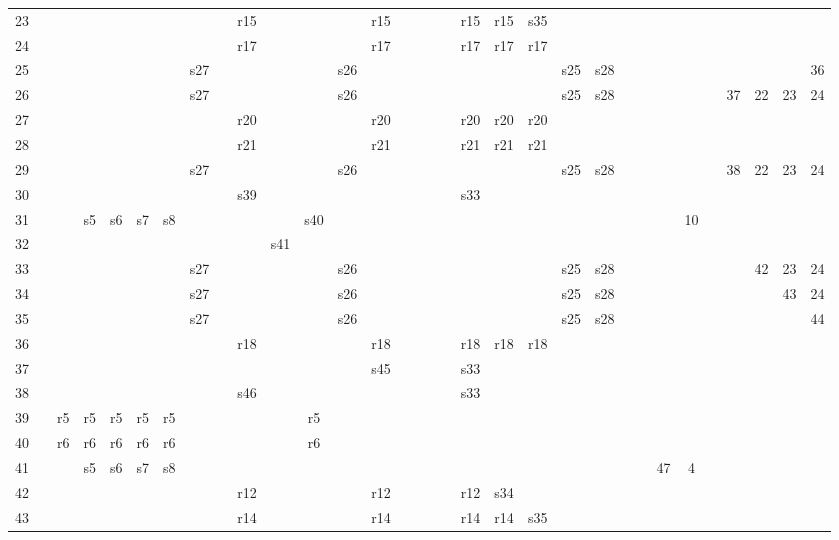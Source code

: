 \documentclass[12pt, letterpaper]{article}
\begin{document}
\begin{landscape}
\begin{longtable}{|c|*{23}{c|}*{8}{c|}}
23 & & & & & & & & & r15 & & & & r15 & & & & & r15 & r15 & s35 & & & & & & & & & & & \\
24 & & & & & & & & & r17 & & & & r17 & & & & & r17 & r17 & r17 & & & & & & & & & & & \\
25 & & & & & & & s27 & & & & & s26 & & & & & & & & & s25 & s28 & & & & & & & & & 36 \\
26 & & & & & & & s27 & & & & & s26 & & & & & & & & & s25 & s28 & & & & & & 37 & 22 & 23 & 24 \\
27 & & & & & & & & & r20 & & & & r20 & & & & & r20 & r20 & r20 & & & & & & & & & & & \\
28 & & & & & & & & & r21 & & & & r21 & & & & & r21 & r21 & r21 & & & & & & & & & & & \\
29 & & & & & & & s27 & & & & & s26 & & & & & & & & & s25 & s28 & & & & & & 38 & 22 & 23 & 24 \\
30 & & & & & & & & & s39 & & & & & & & & & s33 & & & & & & & & & & & & & \\
31 & & & s5 & s6 & s7 & s8 & & & & & s40 & & & & & & & & & & & & & & & 10 & & & & & \\
32 & & & & & & & & & & s41 & & & & & & & & & & & & & & & & & & & & & \\
33 & & & & & & & s27 & & & & & s26 & & & & & & & & & s25 & s28 & & & & & & & 42 & 23 & 24 \\
34 & & & & & & & s27 & & & & & s26 & & & & & & & & & s25 & s28 & & & & & & & & 43 & 24 \\
35 & & & & & & & s27 & & & & & s26 & & & & & & & & & s25 & s28 & & & & & & & & & 44 \\
36 & & & & & & & & & r18 & & & & r18 & & & & & r18 & r18 & r18 & & & & & & & & & & & \\
37 & & & & & & & & & & & & & s45 & & & & & s33 & & & & & & & & & & & & & \\
38 & & & & & & & & & s46 & & & & & & & & & s33 & & & & & & & & & & & & & \\
39 & & r5 & r5 & r5 & r5 & r5 & & & & & r5 & & & & & & & & & & & & & & & & & & & & \\
40 & & r6 & r6 & r6 & r6 & r6 & & & & & r6 & & & & & & & & & & & & & & & & & & & & \\
41 & & & s5 & s6 & s7 & s8 & & & & & & & & & & & & & & & & & & & 47 & 4 & & & & & \\
42 & & & & & & & & & r12 & & & & r12 & & & & & r12 & s34 & & & & & & & & & & & & \\
43 & & & & & & & & & r14 & & & & r14 & & & & & r14 & r14 & s35 & & & & & & & & & & & \\

\end{longtable}
\end{landscape}
\end{document}
